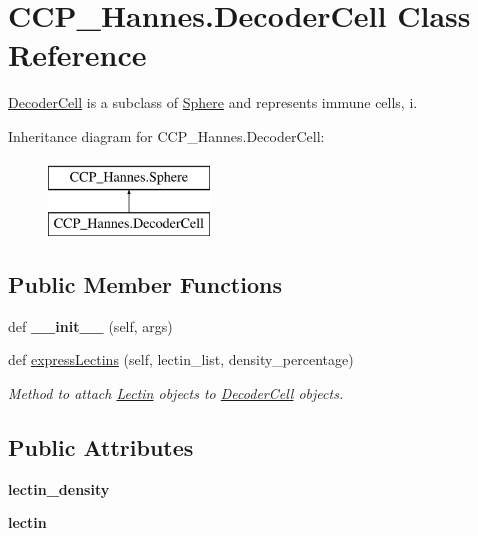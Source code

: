 \hypertarget{class_c_c_p___hannes_1_1_decoder_cell}{}\section{C\+C\+P\+\_\+\+Hannes.\+Decoder\+Cell Class Reference}
\label{class_c_c_p___hannes_1_1_decoder_cell}


\mbox{\hyperlink{class_c_c_p___hannes_1_1_decoder_cell}{Decoder\+Cell}} is a subclass of \mbox{\hyperlink{class_c_c_p___hannes_1_1_sphere}{Sphere}} and represents immune cells, i.  


Inheritance diagram for C\+C\+P\+\_\+\+Hannes.\+Decoder\+Cell\+:\begin{figure}[H]
\begin{center}
\leavevmode
\includegraphics[height=2.000000cm]{class_c_c_p___hannes_1_1_decoder_cell}
\end{center}
\end{figure}
\subsection*{Public Member Functions}
\begin{DoxyCompactItemize}
\item 
\mbox{\label{class_c_c_p___hannes_1_1_decoder_cell_a3b78453be5d5b389de2f141ad0151feb}} 
def {\bfseries \+\_\+\+\_\+init\+\_\+\+\_\+} (self, args)
\item 
def \mbox{\hyperlink{class_c_c_p___hannes_1_1_decoder_cell_afd9c75a3e3a0b21822db336db465df33}{express\+Lectins}} (self, lectin\+\_\+list, density\+\_\+percentage)
\begin{DoxyCompactList}\small\item\em Method to attach \mbox{\hyperlink{class_c_c_p___hannes_1_1_lectin}{Lectin}} objects to \mbox{\hyperlink{class_c_c_p___hannes_1_1_decoder_cell}{Decoder\+Cell}} objects. \end{DoxyCompactList}\end{DoxyCompactItemize}
\subsection*{Public Attributes}
\begin{DoxyCompactItemize}
\item 
\mbox{\label{class_c_c_p___hannes_1_1_decoder_cell_afcf4b1d70245a88a187c0409e9697a43}} 
{\bfseries lectin\+\_\+density}
\item 
\mbox{\label{class_c_c_p___hannes_1_1_decoder_cell_a156ae46d12ffe483195b5b9497f19dc5}} 
{\bfseries lectin}
\end{DoxyCompactItemize}


